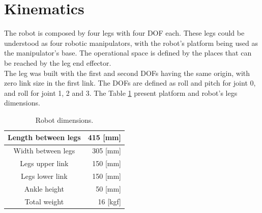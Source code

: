 \section{Kinematics}
The robot is composed by four legs with four DOF each. These legs could be understood as four robotic manipulators, with the robot's platform being used as the manipulator's base. The operational space is defined by the places that can be reached by the leg end effector.\\The leg was built with the first and second DOFs having the same origin, with zero link size in the first link. The DOFs are defined as roll and pitch for joint 0, and roll for joint 1, 2 and 3. The Table \ref{t:parameters} present platform and robot's legs dimensions.
\begin{table}[h]
	\centering
	\begin{tabular}{|c|r|}
		\hline
		Length between legs & 415 [mm] \\ \hline
		Width between legs & 305 [mm] \\ \hline
		Legs upper link & 150 [mm] \\ \hline
		Legs lower link & 150 [mm] \\ \hline
		Ankle height & 50 [mm] \\ \hline
		Total weight & 16 [kgf] \\ \hline
	\end{tabular}	
	\caption{Robot dimensions.}%
	\label{t:parameters}
\end{table}
